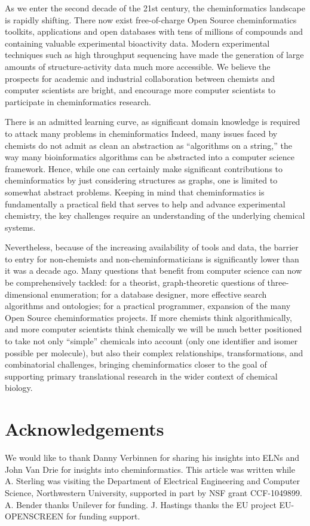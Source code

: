 \documentclass{sig-alternate}
\begin{document}
As we enter the second decade of the 21st century, the cheminformatics
landscape is rapidly shifting.  There now exist free-of-charge Open
Source cheminformatics toolkits, applications and open databases with
tens of millions of compounds and containing valuable experimental
bioactivity data. Modern experimental techniques such as high
throughput sequencing have made the generation of large amounts of
structure-activity data much more accessible.  We believe the
prospects for academic and industrial collaboration between chemists
and computer scientists are bright, and encourage more computer
scientists to participate in cheminformatics research.

There is an admitted learning curve, as significant domain
knowledge is required to attack many problems in cheminformatics 
Indeed, many issues faced by chemists do not admit as clean an
abstraction as ``algorithms on a string,'' the way many bioinformatics
algorithms can be abstracted into a computer science framework.
Hence, while one can certainly make significant contributions to
cheminformatics by just considering structures as graphs, one is
limited to somewhat abstract problems. Keeping in mind that
cheminformatics is fundamentally a practical field that serves to help
and advance experimental chemistry, the key challenges require an
understanding of the underlying chemical systems.

Nevertheless, because of the increasing availability of tools and
data, the barrier to entry for non-chemists and non-cheminformaticians
is significantly lower than it was a decade ago. Many questions that
benefit from computer science can now be comprehensively tackled: for
a theorist, graph-theoretic questions of three-dimensional
enumeration; for a database designer, more effective search algorithms
and ontologies; for a practical programmer, expansion of the many
Open Source cheminformatics projects.  If more chemists think
algorithmically, and more computer scientists think chemically we will be
much better positioned to take not only ``simple'' chemicals into
account (only one identifier and isomer possible per molecule), but
also their complex relationships, transformations, and combinatorial
challenges, bringing cheminformatics closer to the goal of supporting
primary translational research in the wider context of chemical biology.

\section{Acknowledgements}
We would like to thank Danny Verbinnen for sharing his insights into
ELNs and John Van Drie for insights into cheminformatics.  This
article was written while A. Sterling was visiting the Department of
Electrical Engineering and Computer Science, Northwestern University,
supported in part by NSF grant CCF-1049899. A. Bender thanks Unilever
for funding. J. Hastings thanks the EU project EU-OPENSCREEN for
funding support.
\end{document}
